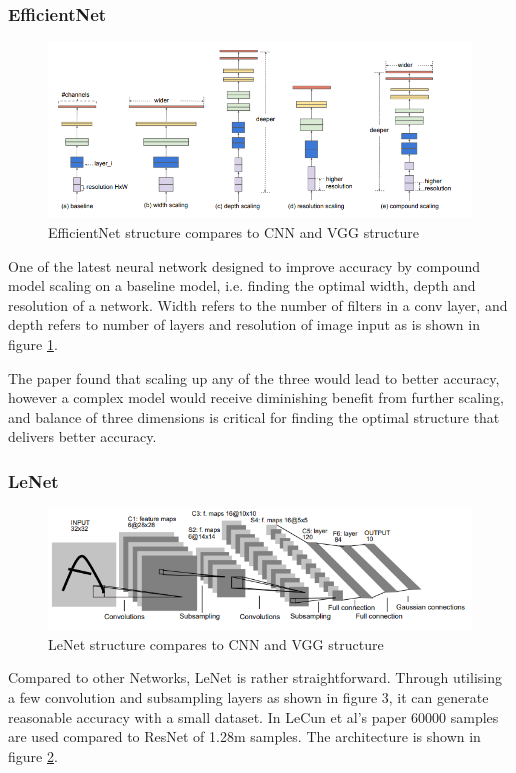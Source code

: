 \documentclass{article} %
\begin{document}
\subsubsection{EfficientNet}
\begin{figure}
\includegraphics[width=\linewidth]{EffiNet}
\caption{EfficientNet structure compares to CNN and VGG structure \label{fig:efficientnet}}
\end{figure}

One of the latest neural network designed to improve accuracy by compound model scaling on a baseline model, i.e. finding the optimal width, depth and resolution of a network. Width refers to the number of filters in a conv layer, and depth refers to number of layers and resolution of image input \cite{Dummy:4} as is shown in figure \ref{fig:efficientnet}.

The paper found that scaling up any of the three would lead to better accuracy, however a complex model would receive diminishing benefit from further scaling, and balance of three dimensions is critical for finding the optimal structure that delivers better accuracy.

\subsubsection{LeNet}
\begin{figure}
\includegraphics[width=\linewidth]{LeNet}
\caption{LeNet structure compares to CNN and VGG structure \label{fig:lenet}}
\end{figure}

Compared to other Networks, LeNet is rather straightforward. Through utilising a few convolution and subsampling layers as shown in figure 3, it can generate reasonable accuracy with a small dataset. In LeCun et al’s paper 60000 samples are used compared to ResNet of 1.28m samples. \cite{Dummy:7} The architecture is shown in figure \ref{fig:lenet}.
\end{document}
